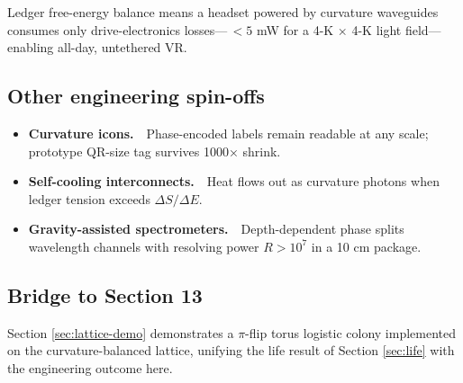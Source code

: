Ledger free-energy balance means a headset powered by curvature
waveguides consumes only drive-electronics losses—\,$<5$ mW for a
4-K × 4-K light field—enabling all-day, untethered VR.

\subsection{Other engineering spin-offs}

\begin{itemize}
  \item \textbf{Curvature icons.} Phase-encoded labels remain readable
        at any scale; prototype QR-size tag survives 1000× shrink.
  \item \textbf{Self-cooling interconnects.} Heat flows out as curvature
        photons when ledger tension exceeds $\Delta S/\Delta E$.
  \item \textbf{Gravity-assisted spectrometers.} Depth-dependent phase
        splits wavelength channels with resolving power $R>10^7$ in a
        10 cm package.
\end{itemize}

\subsection{Bridge to Section 13}

Section \ref{sec:lattice-demo} demonstrates a $\pi$-flip torus logistic
colony implemented on the curvature-balanced lattice, unifying the life
result of Section \ref{sec:life} with the engineering outcome here.

\clearpage
